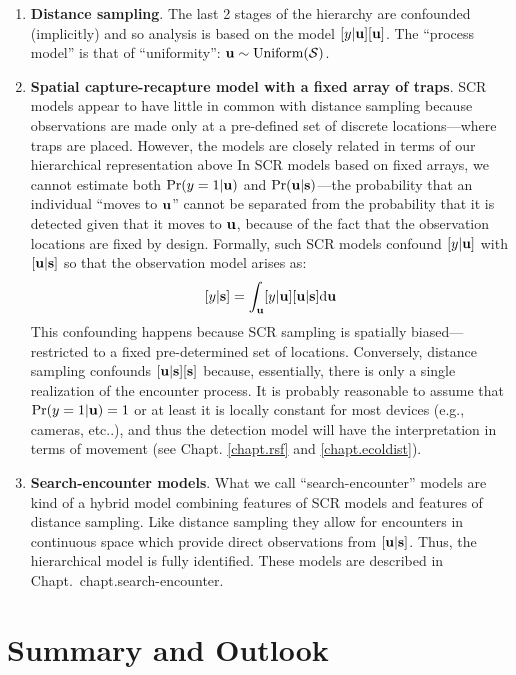 \begin{enumerate}
\item {\bf Distance sampling}. The last 2 stages of the hierarchy
  are confounded (implicitly) and so analysis is based on the model
  $[y|{\bf u}] [{\bf u}]$. The ``process model'' is that of
  ``uniformity'': ${\bf u} \sim \text{Uniform}({\cal S})$.

\item {\bf Spatial capture-recapture model with a fixed array of traps}.
SCR models appear to have little in common with distance sampling
because observations are made only at a pre-defined set of discrete
locations---where traps are placed. However, the models are closely
related in terms of our hierarchical representation above
In SCR models based on fixed arrays, we cannot estimate both
$\Pr(y=1|{\bf u})$ and $\Pr({\bf u}|{\bf s})$---the probability that
an individual ``moves to ${\bf u}$'' cannot be separated from the
probability that it is detected given that it moves to ${\bf u}$,
because of the fact that the observation locations are fixed by
design.
Formally, such SCR models confound $[y|{\bf u}]$  with $[{\bf
  u}|{\bf s}]$ so that the observation model arises as:
\[
 [y|{\bf s}] = \int_{\bf u} [y|{\bf u}][{\bf u}|{\bf s}] \mathrm{d}{\bf u}
\]
This confounding happens because SCR sampling is spatially
biased---restricted to a fixed pre-determined set of locations.
Conversely,
distance sampling confounds $[{\bf u}|{\bf s}][{\bf s}]$ because, essentially, there is
only a single realization of the encounter process.
It is probably
reasonable to assume that $\Pr(y=1|{\bf u})=1$ or at least it is locally
constant for most devices (e.g., cameras, etc..), and thus the
detection model will have the interpretation in terms of movement (see
Chapt. \ref{chapt.rsf} and \ref{chapt.ecoldist}).

\item {\bf Search-encounter models}. What we call
  ``search-encounter'' models \citep{royle_young:2008,royle_etal:2011mee}
  are kind of a hybrid model combining features of SCR models and
  features of distance sampling. Like distance sampling they allow for
  encounters in continuous space which provide direct observations
  from $[{\bf u}|{\bf s}]$. Thus, the
  hierarchical model is fully identified. These models are described
  in Chapt.~{chapt.search-encounter}.


\end{enumerate}



\section{Summary and Outlook}


